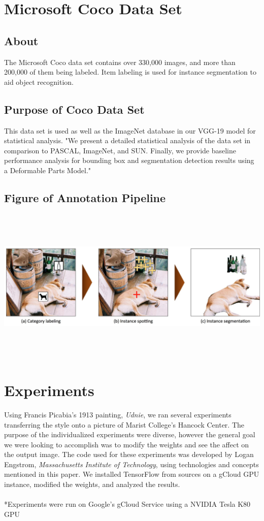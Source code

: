 \documentclass[12pt]{article}
\begin{document}
\section{Microsoft Coco Data Set}

\subsection{About}
The Microsoft Coco data set contains over 330,000 images, and more than 200,000 of them being labeled. Item labeling is used for instance segmentation to aid object recognition. 

\subsection{Purpose of Coco Data Set}
This data set is used as well as the ImageNet database in our VGG-19 model for statistical analysis. "We present a detailed statistical analysis of the data set in comparison to PASCAL, ImageNet, and SUN. Finally, we provide baseline performance analysis for bounding box and segmentation detection results using a Deformable Parts Model."\cite{Coco}

\subsection{Figure of Annotation Pipeline}
\includegraphics[height=75mm, width=160mm]{visuals/pipeline.png}

\section{Experiments}
Using Francis Picabia's 1913 painting, \textit{Udnie}, we ran several experiments transferring the style onto a picture of Marist College's Hancock Center. The purpose of the individualized experiments were diverse, however the general goal we were looking to accomplish was to modify the weights and see the affect on the output image. The code used for these experiments was developed by Logan Engstrom, \textit{Massachusetts Institute of Technology}, using technologies and concepts mentioned in this paper. \cite{Lengstrom} We installed TensorFlow from sources on a gCloud GPU instance, modified the weights, and analyzed the results.
\\
\\
*Experiments were run on Google’s gCloud Service using a NVIDIA Tesla K80 GPU
\\
\end{document}
